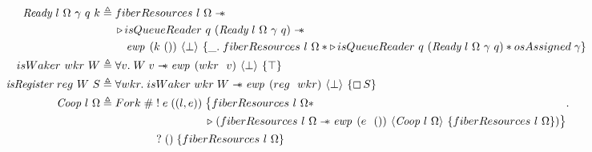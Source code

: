 \begin{figure}[ht]
    \begin{align*}
        \gsReadyF{}~l~\Omega~\gamma~q~k & \triangleq \begin{aligned}[t]
                                                         & \gsFiberResources{l}{\Omega} \wand                                                                                                           \\
                                                         & \later isQueueReader~q~(\gsReadyF{}~l~\Omega~\gamma~q) \wand                                                                                  \\
                                                         & \quad \ewp{k~()}{\bot}{\_.\; \gsFiberResources{l}{\Omega} \ast \later isQueueReader~q~(\gsReadyF{}~l~\Omega~\gamma~q) \ast \gspdone{\gamma} }
                                                    \end{aligned} \\
        \gsIsWaker{}~wkr~W             & \triangleq \forall v.   \;  W\; v \wand{} \ewp{wkr\ \ v}{\bot}{\top}                                                                                                \\
        \gsIsRegF{}~reg~W~S             & \triangleq \forall wkr. \; \gsIsWaker{}\; wkr\; W \wand{} \ewp{reg\ \ wkr}{\bot}{\always S}                                                                         \\
        \protoF{}~l~\Omega              & \triangleq \begin{aligned}[t]
                                                        Fork\;       & \#\; \begin{aligned}[t]
                                     & !\; e\; ((l, e))\; \begin{aligned}[t]
                                           & \big\{ \gsFiberResources{l}{\Omega} \ast                                                                              \\
                                           & \later\; (\gsFiberResources{l}{\Omega} \wand{} \ewp{e\ \ ()}{\protoF{}~l~\Omega}{\gsFiberResources{l}{\Omega}}) \big\}
                                      \end{aligned} . \\
                                     & ?\; ()\; \{ \gsFiberResources{l}{\Omega} \}
                                \end{aligned}                                             \\

\end{aligned}
\end{align*}
\end{figure}
